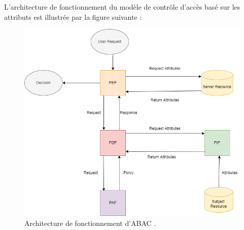 \label{sectionArchitectureABAC}

L'architecture de fonctionnement du modèle de contrôle d'accès basé sur les attributs est illustrée par la figure suivante :

\begin{figure}[h!]
    \centering
		\includegraphics[scale=4]{chap2/images/abac.png}
    \caption{Architecture de fonctionnement d'ABAC \cite{hu20}.}
	 \label{figAbac}
\end{figure}

